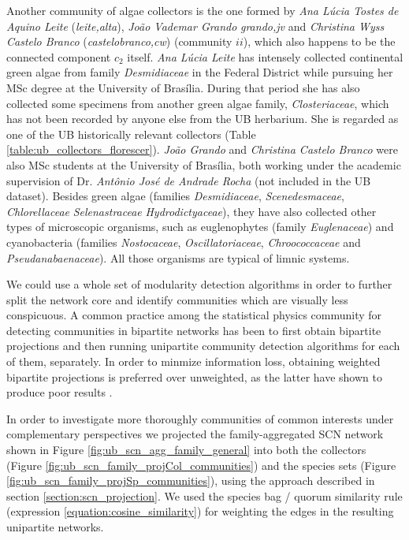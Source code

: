 Another community of algae collectors is the one formed by \textit{Ana Lúcia Tostes de Aquino Leite} (\textit{leite,alta}), \textit{João Vademar Grando} \textit{grando,jv} and \textit{Christina Wyss Castelo Branco} (\textit{castelobranco,cw}) (community $ii$), which also happens to be the connected component $c_2$ itself.
\textit{Ana Lúcia Leite} has intensely collected continental green algae from family \textit{Desmidiaceae} in the Federal District while pursuing her MSc degree at the University of Brasília.
During that period she has also collected some specimens from another green algae family, \textit{Closteriaceae}, which has not been recorded by anyone else from the UB herbarium.
She is regarded as one of the UB historically relevant collectors (Table \ref{table:ub_collectors_florescer}).
%
\textit{João Grando} and \textit{Christina Castelo Branco} were also MSc students at the University of Brasília, both working under the academic supervision of Dr. \textit{Antônio José de Andrade Rocha} (not included in the UB dataset).
Besides green algae (families \textit{Desmidiaceae}, \textit{Scenedesmaceae}, \textit{Chlorellaceae} \textit{Selenastraceae} \textit{Hydrodictyaceae}), they have also collected other types of microscopic organisms, such as euglenophytes (family \textit{Euglenaceae}) and cyanobacteria (families \textit{Nostocaceae}, \textit{Oscillatoriaceae}, \textit{Chroococcaceae} and \textit{Pseudanabaenaceae}). 
All those organisms are typical of limnic systems.
 

We could use a whole set of modularity detection algorithms in order to further split the network core and identify communities which are visually less conspicuous. 
A common practice among the statistical physics community for detecting communities in bipartite networks has been to first obtain bipartite projections and then running unipartite community detection algorithms for each of them, separately.
In order to minmize information loss, obtaining weighted bipartite projections is preferred over unweighted, as the latter have shown to produce poor results \cite{Guimera2007}.


In order to investigate more thoroughly communities of common interests under complementary perspectives we projected the family-aggregated SCN network shown in Figure \ref{fig:ub_scn_agg_family_general} into both the collectors (Figure \ref{fig:ub_scn_family_projCol_communities}) and the species sets (Figure \ref{fig:ub_scn_family_projSp_communities}), using the approach described in section \ref{section:scn_projection}.
We used the species bag / quorum similarity rule (expression \ref{equation:cosine_similarity}) for weighting the edges in the resulting unipartite networks.


